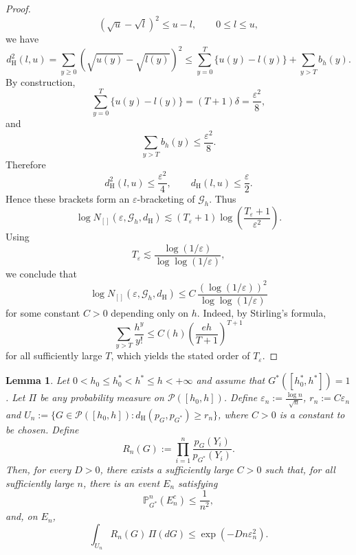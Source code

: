 \documentclass[twoside,12pt]{article}
\renewcommand{\P}{\mathds{P}}
\newtheorem{lem}[thm]{Lemma}
\begin{document}
\begin{proof}
\begin{displaymath}
(\sqrt{u}-\sqrt{l})^2\le u-l,\qquad 0\le l\le u,
\end{displaymath}
we have
\begin{displaymath}
d_{\mathrm H}^2(l,u)=\sum_{y\ge 0}(\sqrt{u(y)}-\sqrt{l(y)})^2\le\sum_{y=0}^T\{u(y)-l(y)\}+\sum_{y>T}b_h(y).
\end{displaymath}
By construction,
\begin{displaymath}
\sum_{y=0}^T\{u(y)-l(y)\}=(T+1)\delta=\frac{\varepsilon^2}{8},
\end{displaymath}
and
\begin{displaymath}
\sum_{y>T}b_h(y)\le \frac{\varepsilon^2}{8}.
\end{displaymath}
Therefore
\begin{displaymath}
d_{\mathrm H}^2(l,u)\le \frac{\varepsilon^2}{4},\qquad d_{\mathrm H}(l,u)\le \frac{\varepsilon}{2}.
\end{displaymath}
Hence these brackets form an $\varepsilon$-bracketing of $\mathcal G_h$. Thus
\begin{displaymath}
\log N_{[]}(\varepsilon,\mathcal G_h,d_{\mathrm H})\lesssim (T_\varepsilon+1)\log\left(\frac{T_\varepsilon+1}{\varepsilon^2}\right).
\end{displaymath}
Using
\begin{displaymath}
T_\varepsilon\lesssim\frac{\log(1/\varepsilon)}{\log\log(1/\varepsilon)},
\end{displaymath}
we conclude that
\begin{displaymath}
\log N_{[]}(\varepsilon,\mathcal G_h,d_{\mathrm H})\le C\,\frac{(\log(1/\varepsilon))^2}{\log\log(1/\varepsilon)}
\end{displaymath}
for some constant $C>0$ depending only on $h$. Indeed, by Stirling's formula,
\begin{displaymath}
\sum_{y>T}\frac{h^y}{y!}\le C(h)\left(\frac{eh}{T+1}\right)^{T+1}
\end{displaymath}
for all sufficiently large $T$, which yields the stated order of $T_\varepsilon$.
\end{proof}


\begin{lem}\label{lem:Poisson_HP_En}
Let $0<h_0\le h_0^\ast<h^\ast\le h<+\infty$ and assume that $G^\ast([h_0^\ast,h^\ast])=1$. Let $\Pi$ be any probability measure on $\mathcal P([h_0,h])$. Define
$\varepsilon_n:=\frac{\log n}{\sqrt n}$, $r_n:=C\varepsilon_n$ and $U_n:=\{G\in\mathcal P([h_0,h]):d_{\mathrm H}(p_G,p_{G^\ast})\ge r_n\}$, where $C>0$ is a constant to be chosen. Define
\begin{displaymath}
R_n(G):=\prod_{i=1}^n\frac{p_G(Y_i)}{p_{G^\ast}(Y_i)}.
\end{displaymath}
Then, for every $D>0$, there exists a sufficiently large $C>0$ such that, for all sufficiently large $n$, there is an event $E_n$ satisfying
\begin{displaymath}
\P_{G^\ast}^n(E_n^c)\le \frac{1}{n^2},
\end{displaymath}
and, on $E_n$,
\begin{displaymath}
\int_{U_n}R_n(G)\,\Pi(dG)\le\exp(-Dn\varepsilon_n^2).
\end{displaymath}
\end{lem}
\end{document}
